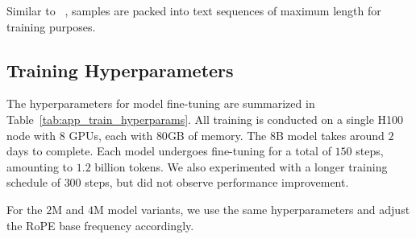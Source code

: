 \documentclass{article}
\begin{document}
Similar to ~\citeauthor{fu2024data},
samples are packed into text sequences of maximum length for training purposes.

\subsection{Training Hyperparameters}

\begin{table}[ht]
\centering
\caption{Hyperparameters for model fine-tuning.
Values with arrows indicate how they change across different stages.
When employing PoSE for longer sequences,
the training sequence length and maximum position id may differ.}
\label{tab:app_train_hyperparams}
\end{table}

The hyperparameters for model fine-tuning are summarized in Table~\ref{tab:app_train_hyperparams}.
All training is conducted on a single H100 node with 8 GPUs,
each with $80$GB of memory.
The $8$B model takes around $2$ days to complete.
Each model undergoes fine-tuning for a total of $150$ steps,
amounting to $1.2$ billion tokens.
We also experimented with a longer training schedule of $300$ steps,
but did not observe performance improvement.

For the $2$M and $4$M model variants,
we use the same hyperparameters and adjust the RoPE base frequency accordingly.
\end{document}
